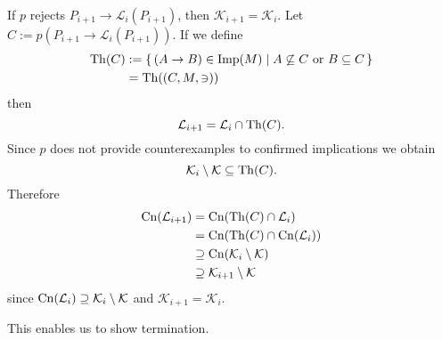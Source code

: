 \begin{Proof}
  If $p$ rejects $P_{i+1} \to \mathcal{L}_i(P_{i+1})$, then $\mathcal{K}_{i+1} =
  \mathcal{K}_i$.  Let $C := p(P_{i+1} \to \mathcal{L}_i(P_{i+1}))$.  If we define
  \begin{align*}
    \operatorname{Th}(C)
    &:= {\{\, (A \to B) \in \operatorname{Imp}(M) \mid A \not\subseteq C \text{ or } B \subseteq C \,\}} \\
    &= \operatorname{Th}((C, M, \ni))
  \end{align*}
  then
  \begin{equation*}
    \mathcal{L}_{i+1} = \mathcal{L}_i \cap \operatorname{Th}(C).
  \end{equation*}
  Since $p$ does not provide counterexamples to confirmed implications we obtain
  \begin{equation*}
    \mathcal{K}_i \setminus \mathcal{K} \subseteq \operatorname{Th}(C).
  \end{equation*}
  Therefore
  \begin{align*}
    \operatorname{Cn}(\mathcal{L}_{i+1})
    &= \operatorname{Cn}(\operatorname{Th}(C) \cap \mathcal{L}_i) \\
    &= \operatorname{Cn}(\operatorname{Th}(C) \cap \operatorname{Cn}(\mathcal{L}_i)) \\
    &\supseteq \operatorname{Cn}(\mathcal{K}_i \setminus \mathcal{K}) \\
    &\supseteq \mathcal{K}_{i+1} \setminus \mathcal{K}
  \end{align*}
  since $\operatorname{Cn}(\mathcal{L}_i) \supseteq \mathcal{K}_i \setminus \mathcal{K}$ and
  $\mathcal{K}_{i+1} = \mathcal{K}_i$.
\end{Proof}

This enables us to show termination.

